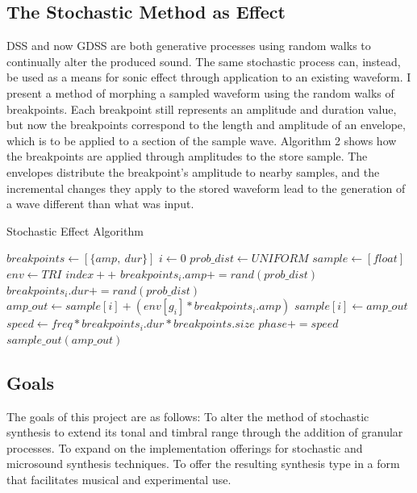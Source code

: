 \documentclass[10pt]{article}
\begin{document}
\subsection{The Stochastic Method as Effect}
DSS and now GDSS are both generative processes using random walks to continually alter the produced sound. The same stochastic process can, instead, be used as a means for sonic effect through application to an existing waveform. I present a method of morphing a sampled waveform using the random walks of breakpoints. Each breakpoint still represents an amplitude and duration value, but now the breakpoints correspond to the length and amplitude of an envelope, which is to be applied to a section of the sample wave. Algorithm 2 shows how the breakpoints are applied through amplitudes to the store sample. The envelopes distribute the breakpoint's amplitude to nearby samples, and the incremental changes they apply to the stored waveform lead to the generation of a wave different than what was input.

\begin{algorithm}
\caption{Stochastic Effect Algorithm}
    \begin{algorithmic}
        \STATE $breakpoints\gets [\{amp,\ dur\}]$
        \STATE $i\gets 0$
        \STATE $prob\_dist\gets UNIFORM$
        \STATE $sample\gets [float]$
        \STATE $env\gets TRI$
        \LOOP
                \STATE $index++$
                \STATE $breakpoints_{i}.amp += rand(prob\_dist)$
                \STATE $breakpoints_{i}.dur += rand(prob\_dist)$
            \ENDIF
            \STATE $amp\_out\gets sample[i] + (env[g_i] * breakpoints_{i}.amp)$
            \STATE $sample[i]\gets amp\_out$
            \STATE $speed\gets freq * breakpoints_{i}.dur * breakpoints.size$
            \STATE $phase += speed$
            \STATE $sample\_out(amp\_out)$
        \ENDLOOP
    \end{algorithmic}
\end{algorithm}

\subsection{Goals}
The goals of this project are as follows: To alter the method of stochastic synthesis to extend its tonal and timbral range through the addition of granular processes. To expand on the implementation offerings for stochastic and microsound synthesis techniques. To offer the resulting synthesis type in a form that facilitates musical and experimental use.
\end{document}
